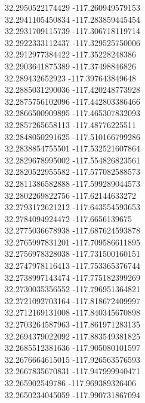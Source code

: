 {32.2950522174429	-117.260949579153\\
32.2941105450834	-117.283859445454\\
32.2931709115739	-117.306718119714\\
32.2922333112437	-117.329525750006\\
32.2912977384422	-117.35228248386\\
32.2903641875389	-117.37498846826\\
32.289432652923	-117.397643849648\\
32.2885031290036	-117.420248773928\\
32.2875756102096	-117.442803386466\\
32.2866500909895	-117.465307832093\\
32.2857265658113	-117.48776225511\\
32.2848050291625	-117.510166799286\\
32.2838854755501	-117.532521607864\\
32.2829678995002	-117.554826823561\\
32.2820522955582	-117.577082588573\\
32.2811386582888	-117.599289044573\\
32.2802269822756	-117.62144633272\\
32.2793172621212	-117.643554593653\\
32.2784094924472	-117.6656139675\\
32.2775036678938	-117.687624593878\\
32.2765997831201	-117.709586611895\\
32.2756978328038	-117.731500160151\\
32.2747978116413	-117.753365376744\\
32.2738997143474	-117.775182399269\\
32.2730035356552	-117.796951364821\\
32.2721092703164	-117.818672409997\\
32.2712169131008	-117.840345670898\\
32.2703264587963	-117.861971283135\\
32.2694379022092	-117.883549381825\\
32.2685512381636	-117.905080101597\\
32.2676664615015	-117.926563576593\\
32.2667835670831	-117.947999940471\\
32.265902549786	-117.969389326406\\
32.2650234045059	-117.990731867094\\
}
